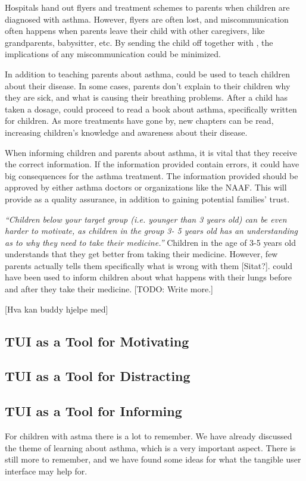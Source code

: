 Hospitals hand out flyers and treatment schemes to parents when children are diagnosed with asthma. However, flyers are often lost, and miscommunication often happens when parents leave their child with other caregivers, like grandparents, babysitter, etc. By sending the child off together with \buddy{}, the implications of any miscommunication could be minimized.    

In addition to teaching parents about asthma, \buddy{} could be used to teach children about their disease. In some cases, parents don't explain to their children why they are sick, and what is causing their breathing problems. After a child has taken a dosage, \buddy{} could proceed to read a book about asthma, specifically written for children. As more treatments have gone by, new chapters can be read, increasing children's knowledge and awareness about their disease.   

When informing children and parents about asthma, it is vital that they receive the correct information. If the information provided contain errors, it could have big consequences for the asthma treatment. The information provided should be approved by either asthma doctors or organizations like the NAAF. This will provide as a quality assurance, in addition to gaining potential families' trust.    

\textit{``Children below your target group (i.e. younger than 3 years old) can be even harder to motivate, as children in the group 3- 5 years old has an understanding as to why they need to take their medicine.''}
Children in the age of 3-5 years old understands that they get better from taking their medicine. However, few parents actually tells them specifically what is wrong with them [Sitat?]. \buddy{} could have been used to inform children about what happens with their lungs before and after they take their medicine. 
[TODO: Write more.] 

[Hva kan buddy hjelpe med]

\subsection{TUI as a Tool for Motivating}


\subsection{TUI as a Tool for Distracting} 


\subsection{TUI as a Tool for Informing}
For children with astma there is a lot to remember. We have already discussed the theme of learning about asthma, which is a very important aspect. There is still more to remember, and we have found some ideas for what the tangible user interface may help for. 

